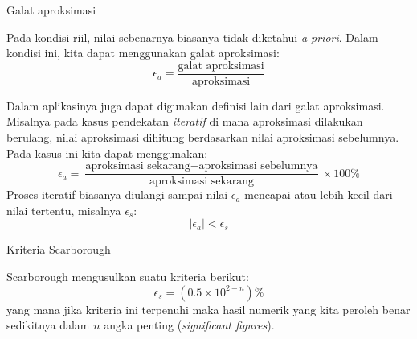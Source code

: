 \begin{frame}{Galat aproksimasi}

Pada kondisi riil, nilai sebenarnya biasanya tidak diketahui \textit{a priori}.
Dalam kondisi ini, kita dapat menggunakan galat aproksimasi:
\begin{equation*}
\epsilon_{a} = \frac{\text{galat aproksimasi}}{\text{aproksimasi}}
\end{equation*}

Dalam aplikasinya juga dapat digunakan definisi lain dari galat aproksimasi.
Misalnya pada kasus pendekatan \textit{iteratif} di mana aproksimasi dilakukan
berulang, nilai aproksimasi dihitung berdasarkan nilai aproksimasi sebelumnya.
Pada kasus ini kita dapat menggunakan:
\begin{equation*}
\epsilon_{a} = \frac{\text{aproksimasi sekarang} - \text{aproksimasi sebelumnya}}%
{\text{aproksimasi sekarang}} \times 100\%
\end{equation*}
Proses iteratif biasanya diulangi sampai nilai $\epsilon_{a}$ mencapai atau
lebih kecil dari nilai tertentu, misalnya $\epsilon_{s}$:
\begin{equation*}
\left| \epsilon_{a} \right| < \epsilon_{s}
\end{equation*}


\end{frame}


\begin{frame}{Kriteria Scarborough}

Scarborough mengusulkan suatu kriteria berikut:
\begin{equation*}
\epsilon_{s} = (0.5 \times 10^{2-n})\%
\end{equation*}
yang mana jika kriteria ini terpenuhi maka hasil numerik yang kita peroleh
benar sedikitnya dalam $n$ angka penting (\textit{significant figures}).

\end{frame}




